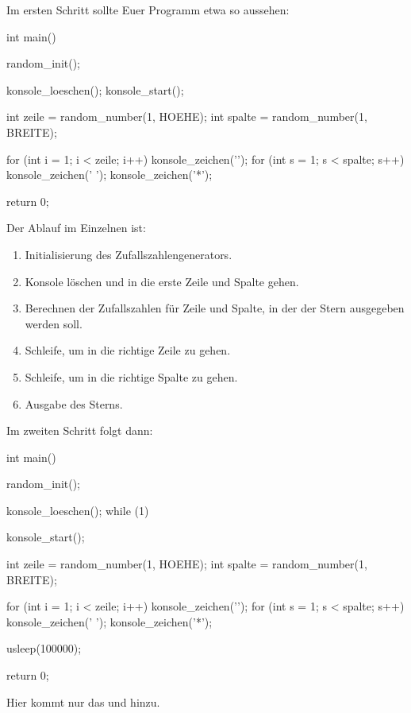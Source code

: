         Im ersten Schritt sollte Euer Programm etwa so aussehen:

\begin{code}
int main() {
    random_init();

    konsole_loeschen();
    konsole_start();

    int zeile = random_number(1, HOEHE);
    int spalte = random_number(1, BREITE);

    for (int i = 1; i < zeile; i++) {
        konsole_zeichen('\n');
    }
    for (int s = 1; s < spalte; s++) {
        konsole_zeichen(' ');
    }
    konsole_zeichen('*');

    return 0;
}
\end{code}
    Der Ablauf im Einzelnen ist:
    \begin{enumerate}
    \item Initialisierung des Zufallszahlengenerators.
    \item Konsole löschen und in die erste Zeile und Spalte gehen.
    \item Berechnen der Zufallszahlen für Zeile und Spalte, in der der Stern ausgegeben werden soll.
    \item Schleife, um in die richtige Zeile zu gehen.
    \item Schleife, um in die richtige Spalte zu gehen.
    \item Ausgabe des Sterns.
    \end{enumerate}

    \noindent
    Im zweiten Schritt folgt dann:
\begin{code}
int main() {
    random_init();

    konsole_loeschen();
    while (1) {
        konsole_start();

        int zeile = random_number(1, HOEHE);
        int spalte = random_number(1, BREITE);

        for (int i = 1; i < zeile; i++) {
            konsole_zeichen('\n');
        }
        for (int s = 1; s < spalte; s++) {
            konsole_zeichen(' ');
        }
        konsole_zeichen('*');

        usleep(100000);
    }

    return 0;
}
\end{code}
    Hier kommt nur das  und  hinzu.
